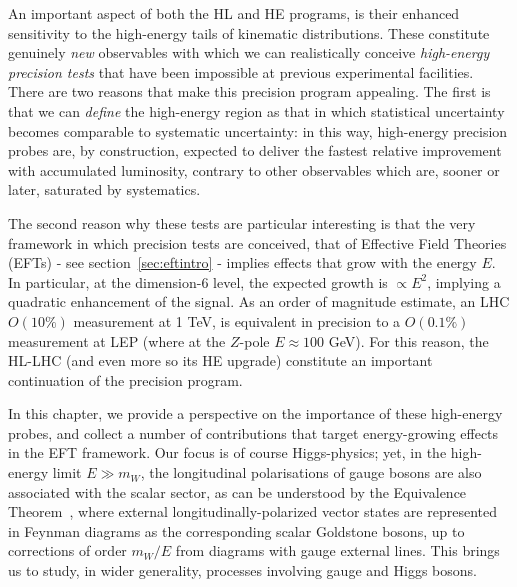 An important aspect of both the HL and HE programs, is their enhanced sensitivity to the high-energy tails of kinematic distributions.  
These constitute genuinely \emph{new} observables with which we can realistically  conceive \emph{high-energy precision tests} that have been impossible at previous experimental facilities.
 There are two reasons that make this precision program appealing. The first is that we can \emph{define} the high-energy region as that in which statistical uncertainty becomes comparable to systematic uncertainty: in this way, high-energy precision probes are, by construction, expected to deliver the fastest relative improvement with accumulated luminosity, contrary to other observables which are, sooner or later, saturated by systematics.

The second reason why these tests are particular interesting is that the very framework in which precision tests are conceived, that of Effective Field Theories (EFTs) -   see section~\ref{sec:eftintro} -  implies effects that grow with the energy $E$. In particular, at the dimension-6 level, the expected growth is $\propto E^2$, implying a quadratic enhancement of the signal. 
As an order of magnitude estimate, an LHC $O(10\%)$ measurement at 1 TeV, is equivalent in precision to a $O(0.1\%)$ measurement at LEP (where at the $Z$-pole $E\approx 100$ GeV). For this reason, the HL-LHC (and even more so its HE upgrade) constitute an important continuation of the precision program. 

In this chapter, we provide a perspective on the importance of these high-energy probes, and collect a number of contributions that target energy-growing effects in the EFT framework.
Our focus is of course Higgs-physics; yet, in the  high-energy  limit $E\gg m_{W}$, the longitudinal polarisations of gauge bosons are also associated with the scalar sector, as can be understood by the Equivalence Theorem~\cite{Chanowitz:1985hj,Wulzer:2013mza}, where external longitudinally-polarized vector states are represented in Feynman diagrams as the corresponding
scalar Goldstone bosons, up to corrections of order $m_W/E$ from diagrams with gauge external lines.
This brings us to study, in wider generality, processes involving gauge  and Higgs bosons. %

